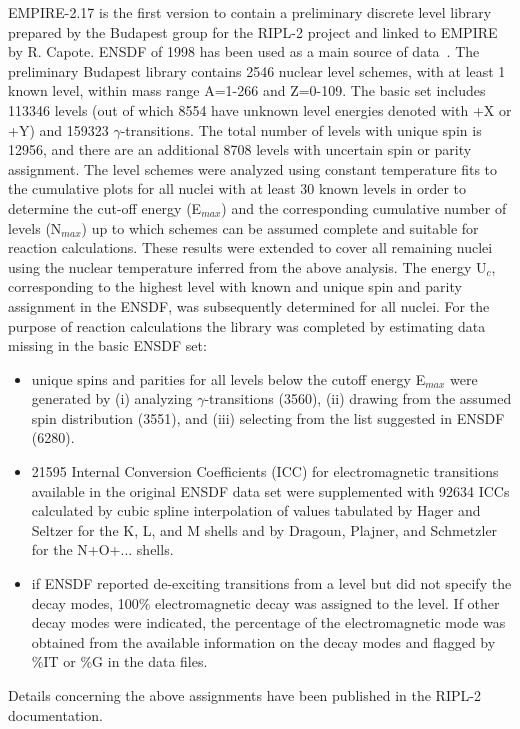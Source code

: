\documentclass[twocolumn,amsmath,amssymb,10pt,groupedaddress,a4paper]{revtex4}
\begin{document}
EMPIRE-2.17 is the first version to contain a preliminary discrete
level library prepared by the Budapest group for the RIPL-2
project and linked to EMPIRE by R. Capote. ENSDF of 1998 has been
used as a main source of data~\cite{ENSDF,Firestone}. The preliminary
Budapest library contains 2546 nuclear level schemes, with at least
1 known level, within mass range A=1-266 and Z=0-109. The basic set
includes 113346 levels (out of which 8554 have unknown level energies
denoted with +X or +Y) and 159323 $\gamma$-transitions. The total
number of levels with unique spin is 12956, and there are an additional
8708 levels with uncertain spin or parity assignment.
The level schemes were analyzed using constant temperature fits to
the cumulative plots for all nuclei with at least 30 known levels
in order to determine the cut-off energy (E$_{{max}}$) and the corresponding
cumulative number of levels (N$_{{max}}$) up to which schemes can
be assumed complete and suitable for reaction calculations. These
results were extended to cover all remaining nuclei using the nuclear
temperature inferred from the above analysis. The energy U$_{{c}}$,
corresponding to the highest level with known and unique spin and
parity assignment in the ENSDF, was subsequently determined for all
nuclei.
For the purpose of reaction calculations the library was completed
by estimating data missing in the basic ENSDF set:
\begin{itemize}
\item unique spins and parities for all levels below the cutoff energy E$_{{max}}$
were generated by (i) analyzing $\gamma$-transitions (3560), (ii)
drawing from the assumed spin distribution (3551), and (iii) selecting
from the list suggested in ENSDF (6280).
\item 21595 Internal Conversion Coefficients (ICC) for electromagnetic transitions
available in the original ENSDF data set were supplemented with 92634
ICCs calculated by cubic spline interpolation of values tabulated
by Hager and Seltzer for the K, L, and M shells and by Dragoun, Plajner,
and Schmetzler for the N+O+... shells.
\item if ENSDF reported de-exciting transitions from a level but did not
specify the decay modes, 100\% electromagnetic decay was assigned
to the level. If other decay modes were indicated, the percentage
of the electromagnetic mode was obtained from the available information
on the decay modes and flagged by \%IT or \%G in the data files.
\end{itemize}
Details concerning the above assignments have been published in the
RIPL-2 documentation.
\end{document}

